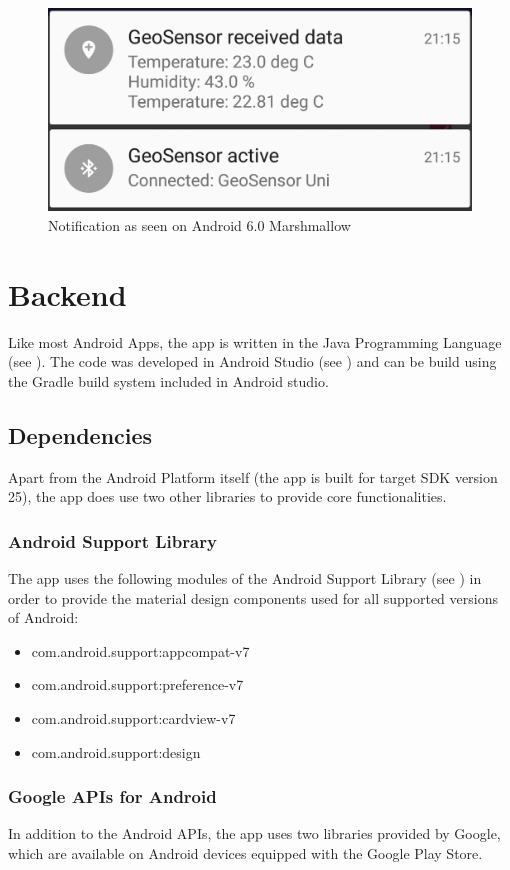 \begin{figure}
\centering
\includegraphics[width=.4\linewidth]{src/notification.png}
\caption{Notification as seen on Android 6.0 Marshmallow}
\label{fig:notification}
\end{figure}

\section{Backend}
Like most Android Apps, the app is written in the Java Programming Language (see \cite{JavaSpec}). The code was developed in Android Studio (see \cite{AndroidStudio}) and can be build using the Gradle build system included in Android studio.

\subsection{Dependencies}
Apart from the Android Platform itself (the app is built for target SDK version 25), the app does use two other libraries to provide core functionalities.

\subsubsection{Android Support Library}
The app uses the following modules of the Android Support Library (see \cite{AppCompat}) in order to provide the material design components used for all supported versions of Android:
\begin{itemize}
\item com.android.support:appcompat-v7
\item com.android.support:preference-v7
\item com.android.support:cardview-v7
\item com.android.support:design
\end{itemize}

\subsubsection{Google APIs for Android}
In addition to the Android APIs, the app uses two libraries provided by Google, which are available on Android devices equipped with the Google Play Store. 

